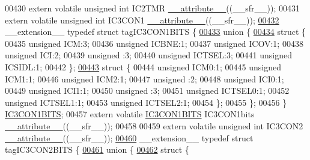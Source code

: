 \begin{DoxyCode}
00430 \textcolor{keyword}{extern} \textcolor{keyword}{volatile} \textcolor{keywordtype}{unsigned} \textcolor{keywordtype}{int}  IC2TMR \hyperlink{a00009_a493c46f03454991ccc5aa7a6e1dfb2a7}{\_\_attribute\_\_}((\_\_sfr\_\_));
00431 \textcolor{keyword}{extern} \textcolor{keyword}{volatile} \textcolor{keywordtype}{unsigned} \textcolor{keywordtype}{int}  IC3CON1 \hyperlink{a00009_a493c46f03454991ccc5aa7a6e1dfb2a7}{\_\_attribute\_\_}((\_\_sfr\_\_));
\hypertarget{a00009_source_l00432}{}\hyperlink{a00008}{00432} \_\_extension\_\_ \textcolor{keyword}{typedef} \textcolor{keyword}{struct }tagIC3CON1BITS \{
\hypertarget{a00009_source_l00433}{}\hyperlink{a00009}{00433}   \textcolor{keyword}{union }\{
\hypertarget{a00009_source_l00434}{}\hyperlink{a00009}{00434}     \textcolor{keyword}{struct }\{
00435       \textcolor{keywordtype}{unsigned} ICM:3;
00436       \textcolor{keywordtype}{unsigned} ICBNE:1;
00437       \textcolor{keywordtype}{unsigned} ICOV:1;
00438       \textcolor{keywordtype}{unsigned} ICI:2;
00439       \textcolor{keywordtype}{unsigned} :3;
00440       \textcolor{keywordtype}{unsigned} ICTSEL:3;
00441       \textcolor{keywordtype}{unsigned} ICSIDL:1;
00442     \};
\hypertarget{a00009_source_l00443}{}\hyperlink{a00009}{00443}     \textcolor{keyword}{struct }\{
00444       \textcolor{keywordtype}{unsigned} ICM0:1;
00445       \textcolor{keywordtype}{unsigned} ICM1:1;
00446       \textcolor{keywordtype}{unsigned} ICM2:1;
00447       \textcolor{keywordtype}{unsigned} :2;
00448       \textcolor{keywordtype}{unsigned} ICI0:1;
00449       \textcolor{keywordtype}{unsigned} ICI1:1;
00450       \textcolor{keywordtype}{unsigned} :3;
00451       \textcolor{keywordtype}{unsigned} ICTSEL0:1;
00452       \textcolor{keywordtype}{unsigned} ICTSEL1:1;
00453       \textcolor{keywordtype}{unsigned} ICTSEL2:1;
00454     \};
00455   \};
00456 \} \hyperlink{a00008_d7/d5e/a00467}{IC3CON1BITS};
00457 \textcolor{keyword}{extern} \textcolor{keyword}{volatile} \hyperlink{a00008_d7/d5e/a00467}{IC3CON1BITS} IC3CON1bits \hyperlink{a00009_a493c46f03454991ccc5aa7a6e1dfb2a7}{\_\_attribute\_\_}((\_\_sfr\_\_));
00458 
00459 \textcolor{keyword}{extern} \textcolor{keyword}{volatile} \textcolor{keywordtype}{unsigned} \textcolor{keywordtype}{int}  IC3CON2 \hyperlink{a00009_a493c46f03454991ccc5aa7a6e1dfb2a7}{\_\_attribute\_\_}((\_\_sfr\_\_));
\hypertarget{a00009_source_l00460}{}\hyperlink{a00008}{00460} \_\_extension\_\_ \textcolor{keyword}{typedef} \textcolor{keyword}{struct }tagIC3CON2BITS \{
\hypertarget{a00009_source_l00461}{}\hyperlink{a00009}{00461}   \textcolor{keyword}{union }\{
\hypertarget{a00009_source_l00462}{}\hyperlink{a00009}{00462}     \textcolor{keyword}{struct }\{

\end{DoxyCode}
